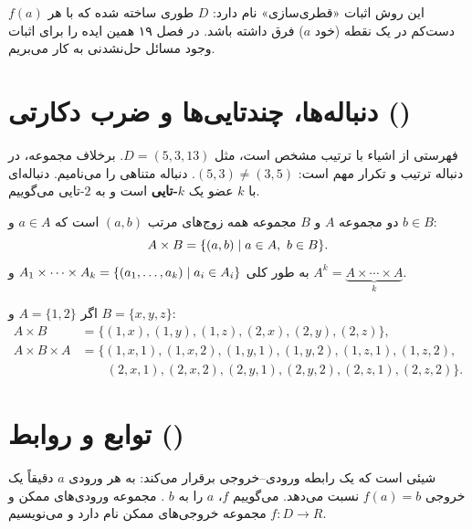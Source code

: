 \begin{note}
این روش اثبات «قطری‌سازی» نام دارد: $D$ طوری ساخته شده که با هر $f(a)$ دست‌کم در یک نقطه (خود $a$) فرق داشته باشد. در فصل ۱۹ همین ایده را برای اثبات وجود مسائل حل‌نشدنی به کار می‌بریم.
\end{note}

\section{دنباله‌ها، چندتایی‌ها و ضرب دکارتی ()}

 فهرستی از اشیاء با ترتیب مشخص است، مثل $D=(5,3,13)$. برخلاف مجموعه، در دنباله ترتیب و تکرار مهم است: $(5,3)\neq(3,5)$. دنباله متناهی را  می‌نامیم. دنباله‌ای با $k$ عضو یک \textbf{$k$-تایی} است و به $2$-تایی  می‌گوییم.

\begin{definition}
 دو مجموعه $A$ و $B$ مجموعه همه زوج‌های مرتب $(a,b)$ است که $a\in A$ و $b\in B$:
\[A\times B=\{(a,b)\mid a\in A,\ b\in B\}.\]
به طور کلی $A_1\times\cdots\times A_k=\{(a_1,\dots,a_k)\mid a_i\in A_i\}$ و $A^k=\underbrace{A\times\cdots\times A}_{k}$.
\end{definition}

\begin{example}
اگر $A=\{1,2\}$ و $B=\{x,y,z\}$:
\begin{align*}
A\times B&=\{(1,x),(1,y),(1,z),(2,x),(2,y),(2,z)\},\\
A\times B\times A&=\{(1,x,1),(1,x,2),(1,y,1),(1,y,2),(1,z,1),(1,z,2),\\
&\qquad (2,x,1),(2,x,2),(2,y,1),(2,y,2),(2,z,1),(2,z,2)\}.
\end{align*}
\end{example}

\section{توابع و روابط ()}

\begin{definition}[تابع]
 شیئی است که یک رابطه ورودی–خروجی برقرار می‌کند: به هر ورودی $a$ دقیقاً یک خروجی $f(a)=b$ نسبت می‌دهد. می‌گوییم $f$، $a$ را به $b$ . مجموعه ورودی‌های ممکن  و مجموعه خروجی‌های ممکن  نام دارد و می‌نویسیم $f:D\to R$.
\end{definition}

